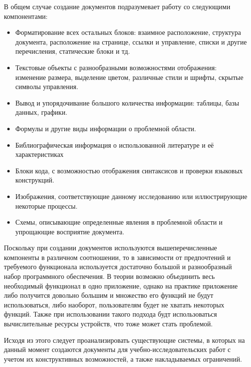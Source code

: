 В общем случае создание документов подразумевает работу со следующими компонентами:

\begin{itemize} 
	\item Форматирование всех остальных блоков: взаимное расположение, структура документа, расположение на странице, ссылки и управление, списки и другие перечисления, статические блоки и тд.
	\item Текстовые объекты с разнообразными возможностями отображения: изменение размера, выделение цветом, различные стили и шрифты, скрытые символы управления.
	\item Вывод и упорядочивание большого количества информации: таблицы, базы данных, графики.
	\item Формулы и другие виды информации о проблемной области.
	\item Библиографическая информация о использованной литературе и её характеристиках
	\item Блоки кода, с возможностью отображения синтаксисов и проверки языковых конструкций.
	\item Изображения, соответствующие данному исследованию или иллюстрирующие некоторые процессы.
	\item Схемы, описывающие определенные явления в проблемной области и упрощающие восприятие документа.
\end{itemize}

Поскольку при создании документов используются вышеперечисленные компоненты в различном соотношении, то в зависимости от предпочтений и требуемого функционала используется достаточно большой и разнообразный набор программного обеспечения. В теории возможно объединить весь необходимый функционал в одно приложение, однако на практике приложение либо получится довольно большим и множество его функций не будут использоваться, либо наоборот, пользователям будет не хватать некоторых функций. Также при использовании такого подхода будт использоваться вычислительные ресурсы устройств, что тоже может стать проблемой.

Исходя из этого следует проанализировать существующие системы, в которых на данный момент создаются документы для учебно-исследовательских работ с учетом их конструктивных возможностей, а также накладываемых ограничений.

